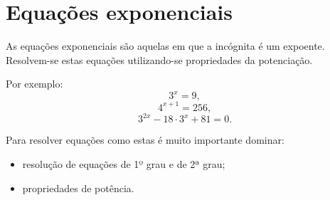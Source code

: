 

 \section{Equações exponenciais}

\begin{obs}
 As equações exponenciais são aquelas em que a incógnita é um expoente. Resolvem-se estas equações 
utilizando-se propriedades da potenciação.
\end{obs}

Por exemplo:
\begin{equation*}
3^x= 9 ,
\end{equation*}
\begin{equation*}
4^{x+1}= 256 ,
\end{equation*}
\begin{equation*}
3^{2x}- 18\cdot 3^x + 81=0 .
\end{equation*}

Para resolver equações como estas é muito importante dominar:
\begin{itemize}
 \item resolução de equações de 1º grau e de 2ª grau;
 \item propriedades de potência.
\end{itemize}









